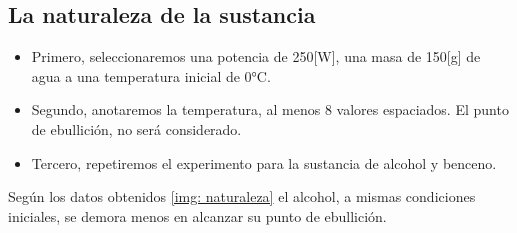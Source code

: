\documentclass[a4paper, 12p]{article}
\begin{document}
\subsection{La naturaleza de la sustancia}
\begin{itemize}
      \item Primero, seleccionaremos una potencia de 250[W], una masa de 150[g] de agua a una temperatura inicial de 0°C.
      \item Segundo, anotaremos la temperatura, al menos 8 valores espaciados. El punto de ebullición, no será considerado.
      \item Tercero, repetiremos el experimento para la sustancia de alcohol y benceno.
\end{itemize}
Según los datos obtenidos \ref{img: naturaleza} el alcohol, a mismas condiciones iniciales, se demora menos en alcanzar su punto de ebullición.
\end{document}

